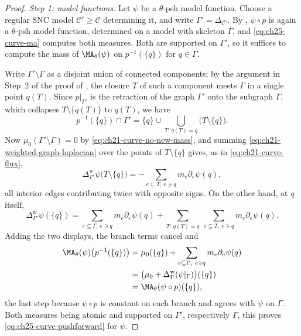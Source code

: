 \begin{proof}
\emph{Step 1: model functions.}  Let $\psi$ be a $\theta$-psh model
function.  Choose a regular SNC model $\mathcal C'\geq\mathcal C$
determining it, and write $\Gamma'=\Delta_{\mathcal C'}$.  By
, $\psi\circ p$ is again a $\theta$-psh
model function, determined on a model with skeleton $\Gamma$, and
\eqref{eq:ch25-curve-ma} computes both measures.  Both are supported on
$\Gamma'$, so it suffices to compute the mass of $\MA_\theta(\psi)$ on
$p^{-1}(\{q\})$ for $q\in\Gamma$.

Write $\Gamma'\setminus\Gamma$ as a disjoint union of connected components;
by the argument in Step~2 of the proof of
, the closure $T$ of such a component
meets $\Gamma$ in a single point $q(T)$.  Since
$p|_{\Gamma'}$ is the retraction of the graph $\Gamma'$ onto the
subgraph $\Gamma$, which collapses $T\setminus\{q(T)\}$ to $q(T)$, we
have
\[
 p^{-1}(\{q\})\cap\Gamma'
 =\{q\}\cup\bigcup_{T:\,q(T)=q}\bigl(T\setminus\{q\}\bigr).
\]
Now $\mu_0(\Gamma'\setminus\Gamma)=0$ by
\eqref{eq:ch21-curve-no-new-mass}, and summing
\eqref{eq:ch21-weighted-graph-laplacian} over the points of
$T\setminus\{q\}$ gives, as in \eqref{eq:ch21-curve-flux},
\[
 \Delta^{\mathrm w}_{\Gamma'}\psi\bigl(T\setminus\{q\}\bigr)
 =-\sum_{e\subseteq T,\ e\ni q}m_e\partial_e\psi(q),
\]
all interior edges contributing twice with opposite signs.  On the other
hand, at $q$ itself,
\[
 \Delta^{\mathrm w}_{\Gamma'}\psi(\{q\})
 =\sum_{e\subseteq\Gamma,\ e\ni q}m_e\partial_e\psi(q)
  +\sum_{T:\,q(T)=q}\ \sum_{e\subseteq T,\ e\ni q}
       m_e\partial_e\psi(q).
\]
Adding the two displays, the branch terms cancel and
\[
 \begin{aligned}
 \MA_\theta(\psi)\bigl(p^{-1}(\{q\})\bigr)
 &=\mu_0(\{q\})+
   \sum_{e\subseteq\Gamma,\ e\ni q}m_e\partial_e\psi(q)\\
 &=\bigl(\mu_0+\Delta^{\mathrm w}_\Gamma
                 (\psi|_\Gamma)\bigr)(\{q\})\\
 &=\MA_\theta(\psi\circ p)(\{q\}),
 \end{aligned}
\]
the last step because $\psi\circ p$ is constant on each branch and agrees
with $\psi$ on $\Gamma$.  Both measures being atomic and supported on
$\Gamma'$, respectively $\Gamma$, this proves
\eqref{eq:ch25-curve-pushforward} for $\psi$.


\end{proof}
